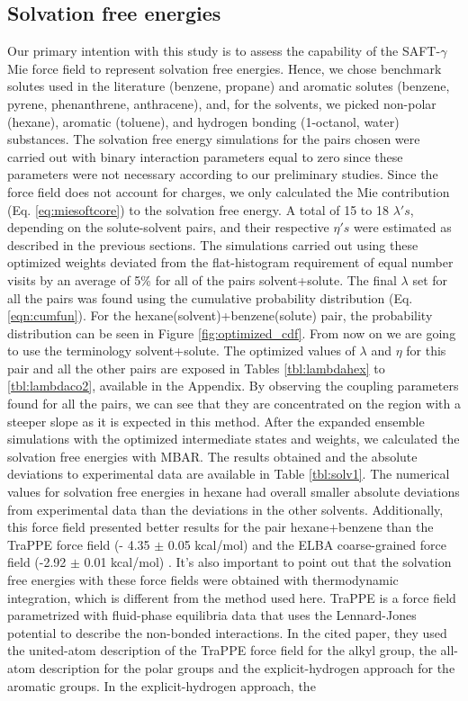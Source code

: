 \documentclass[final,12p,times,twocolumn]{elsarticle}
\begin{document}
	\subsection{Solvation free energies}
	
	Our primary intention with this study is to assess the capability of the SAFT-$\gamma$ Mie force field to represent solvation free energies. Hence, we chose benchmark solutes used in the literature (benzene, propane) and aromatic solutes (benzene, pyrene, phenanthrene, anthracene), and, for the solvents, we picked non-polar (hexane), aromatic (toluene), and hydrogen bonding (1-octanol, water) substances. The solvation free energy simulations for the pairs chosen were carried out with binary interaction parameters equal to zero since these parameters were not necessary according to our preliminary studies. Since the force field does not account for charges, we only calculated the Mie contribution (Eq. \ref{eq:miesoftcore}) to the solvation free energy. A total of 15 to 18 $\lambda 's$, depending on the solute-solvent pairs, and their respective $\eta 's$ were estimated as described in the previous sections. The simulations carried out using these optimized weights deviated from the flat-histogram requirement of equal number visits by an average of 5\% for all of the pairs solvent+solute. The final $\lambda$ set for all the pairs was found using the cumulative probability distribution (Eq. \eqref{eqn:cumfun}). For the hexane(solvent)+benzene(solute) pair, the probability distribution  can be seen in Figure \ref{fig:optimized_cdf}. From now on we are going to use the terminology solvent+solute. The optimized values of $\lambda$ and $\eta$ for this pair and all the other pairs are exposed in Tables \ref{tbl:lambdahex} to \ref{tbl:lambdaco2}, available in the Appendix. By observing the coupling parameters found for all the pairs, we can see that they are concentrated on the region with a steeper slope as it is expected in this method. After the expanded ensemble simulations with the optimized intermediate states and weights, we calculated the solvation free energies with MBAR. The results obtained and the absolute deviations to experimental data \cite{doi:10.1021/ci034120c} are available  in Table \ref{tbl:solv1}. The numerical values for solvation free energies in hexane had overall smaller absolute deviations from experimental data than the deviations in the other solvents. Additionally, this force field presented better results for the pair hexane+benzene than the TraPPE force field (- 4.35  $\pm$ 0.05 kcal/mol) \cite{garrido2011} and the ELBA coarse-grained force field  (-2.92 $\pm$ 0.01 kcal/mol) \cite{doi:10.1021/acs.jctc.5b00963}. It's also important to point out that the solvation free energies with these force fields were obtained with thermodynamic integration, which is different from the method used here. TraPPE is a force field parametrized with fluid-phase equilibria data that uses the Lennard-Jones potential to describe the non-bonded interactions. In the cited paper, they used the united-atom description of the TraPPE force field for the alkyl group, the all-atom description for the polar groups and the explicit-hydrogen approach for the aromatic groups. In the explicit-hydrogen approach, the 
\end{document}
